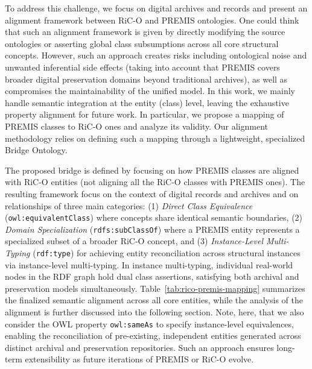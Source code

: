 \documentclass[runningheads]{llncs}
\begin{document}
	To address this challenge, we focus on digital archives and records and present an alignment framework between RiC-O and PREMIS ontologies. One could think that such an alignment framework is given by directly modifying the source ontologies or asserting global class subsumptions across all core structural concepts. However, such an approach creates risks including ontological noise and unwanted inferential side effects (taking into account that PREMIS covers broader digital preservation domains beyond traditional archives), as well as compromises the maintainability of the unified model.
	In this work, we mainly handle semantic integration at the entity (class) level, leaving the exhaustive property alignment for future work. In particular, we propose a mapping of PREMIS classes to RiC-O ones and analyze its validity. Our alignment methodology relies on defining such a mapping through a lightweight, specialized Bridge Ontology.
	
	The proposed bridge is defined by focusing on how PREMIS classes are aligned with RiC-O entities (not aligning all the RiC-O classes with PREMIS ones). 
	The resulting framework focus on the context of digital records and archives and on relationships of three main categories: (1) \textit{Direct Class Equivalence} (\texttt{owl:equivalentClass}) where concepts share identical semantic boundaries, (2) \textit{Domain Specialization} (\texttt{rdfs:subClassOf}) where a PREMIS entity represents a specialized subset of a broader RiC-O concept, and (3) \textit{Instance-Level Multi-Typing} (\texttt{rdf:type}) for achieving entity reconciliation across structural instances via instance-level multi-typing.
	In instance multi-typing, individual real-world nodes in the RDF graph hold dual class assertions, satisfying both archival and preservation models simultaneously. Table~\ref{tab:rico-premis-mapping} summarizes the finalized semantic alignment across all core entities, while the analysis of the alignment is further discussed into the following section.
	Note, here, that we also consider the OWL property \texttt{owl:sameAs} to specify instance-level equivalences, enabling the reconciliation of pre-existing, independent entities generated across distinct archival and preservation repositories. Such an approach ensures long-term extensibility as future iterations of PREMIS or RiC-O evolve.
	
\end{document}
